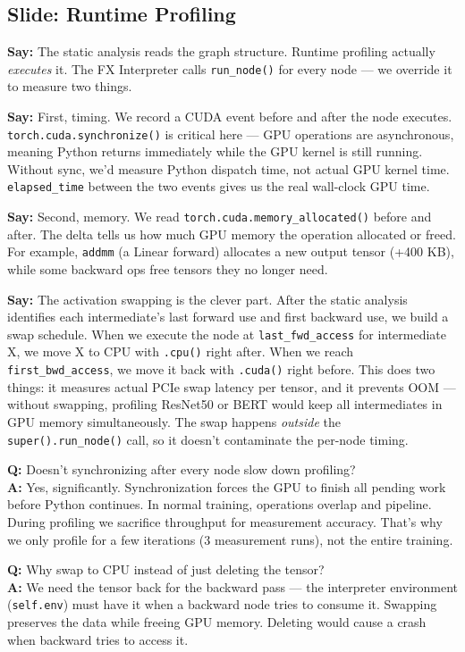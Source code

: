 \documentclass[11pt]{article}
\newcommand{\slide}[1]{\subsection*{Slide: #1}}
\newcommand{\say}[1]{\textbf{Say:} #1}
\newcommand{\qa}[2]{\textcolor{question}{\textbf{Q:} #1} \\ \textbf{A:} #2}
\begin{document}
\slide{Runtime Profiling}
\say{The static analysis reads the graph structure. Runtime profiling actually \emph{executes} it. The FX Interpreter calls \texttt{run\_node()} for every node --- we override it to measure two things.}

\say{First, timing. We record a CUDA event before and after the node executes. \texttt{torch.cuda.synchronize()} is critical here --- GPU operations are asynchronous, meaning Python returns immediately while the GPU kernel is still running. Without sync, we'd measure Python dispatch time, not actual GPU kernel time. \texttt{elapsed\_time} between the two events gives us the real wall-clock GPU time.}

\say{Second, memory. We read \texttt{torch.cuda.memory\_allocated()} before and after. The delta tells us how much GPU memory the operation allocated or freed. For example, \texttt{addmm} (a Linear forward) allocates a new output tensor (+400 KB), while some backward ops free tensors they no longer need.}

\say{The activation swapping is the clever part. After the static analysis identifies each intermediate's last forward use and first backward use, we build a swap schedule. When we execute the node at \texttt{last\_fwd\_access} for intermediate X, we move X to CPU with \texttt{.cpu()} right after. When we reach \texttt{first\_bwd\_access}, we move it back with \texttt{.cuda()} right before. This does two things: it measures actual PCIe swap latency per tensor, and it prevents OOM --- without swapping, profiling ResNet50 or BERT would keep all intermediates in GPU memory simultaneously. The swap happens \emph{outside} the \texttt{super().run\_node()} call, so it doesn't contaminate the per-node timing.}

\qa{Doesn't synchronizing after every node slow down profiling?}{Yes, significantly. Synchronization forces the GPU to finish all pending work before Python continues. In normal training, operations overlap and pipeline. During profiling we sacrifice throughput for measurement accuracy. That's why we only profile for a few iterations (3 measurement runs), not the entire training.}

\qa{Why swap to CPU instead of just deleting the tensor?}{We need the tensor back for the backward pass --- the interpreter environment (\texttt{self.env}) must have it when a backward node tries to consume it. Swapping preserves the data while freeing GPU memory. Deleting would cause a crash when backward tries to access it.}
\end{document}
